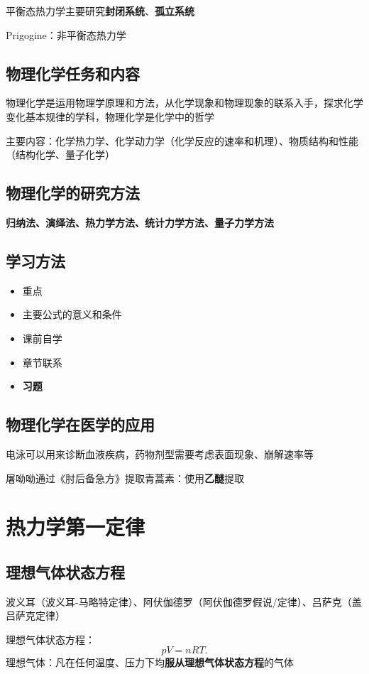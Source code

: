 平衡态热力学主要研究\textbf{封闭系统}、\textbf{孤立系统}
\begin{eg}
    Prigogine：非平衡态热力学
\end{eg} 
\subsection{物理化学任务和内容}%
\label{sub:物理化学任务和内容}
物理化学是运用物理学原理和方法，从化学现象和物理现象的联系入手，探求化学变化基本规律的学科，物理化学是化学中的哲学

主要内容：化学热力学、化学动力学（化学反应的速率和机理）、物质结构和性能（结构化学、量子化学）
\subsection{物理化学的研究方法}%
\label{sub:物理化学的研究方法}
\textbf{归纳法、演绎法、热力学方法、统计力学方法、量子力学方法}
\subsection{学习方法}%
\label{sub:学习方法}
\begin{itemize}
    \item 重点
    \item 主要公式的意义和条件
    \item 课前自学
    \item 章节联系
    \item \textbf{习题}
\end{itemize}
\subsection{物理化学在医学的应用}%
\label{sub:物理化学在医学的应用}
电泳可以用来诊断血液疾病，药物剂型需要考虑表面现象、崩解速率等

屠呦呦通过《肘后备急方》提取青蒿素：使用\textbf{乙醚}提取
\section{热力学第一定律}%
\label{sec:热力学第一定律}
\subsection{理想气体状态方程}%
\label{sub:理想气体状态方程}
波义耳（波义耳-马略特定律）、阿伏伽德罗（阿伏伽德罗假说/定律）、吕萨克（盖吕萨克定律）
\begin{defi}
    理想气体状态方程：\[
        pV=nRT
    .\]
    理想气体：凡在任何温度、压力下均\textbf{服从理想气体状态方程}的气体
\end{defi}
